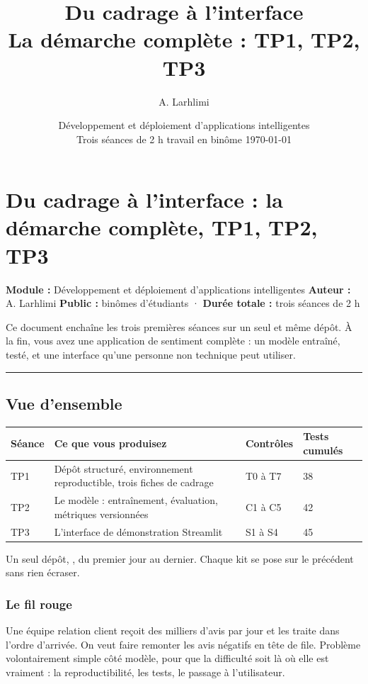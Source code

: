 \documentclass[11pt,a4paper]{article}
\title{\vspace{-1.2cm}\textbf{Du cadrage à l'interface\\ La démarche complète : TP1, TP2, TP3}}
\author{A. Larhlimi}
\date{Développement et déploiement d'applications intelligentes\\
Trois séances de 2 h \textperiodcentered{} travail en binôme \textperiodcentered{} \today}
\newcommand{\co}[1]{\texttt{\detokenize{#1}}}
\begin{document}
\maketitle
\thispagestyle{fancy}
\tableofcontents
\bigskip

\section{Du cadrage à l'interface : la démarche complète, TP1, TP2, TP3}

\textbf{Module :} Développement et déploiement d'applications intelligentes
\textbf{Auteur :} A. Larhlimi
\textbf{Public :} binômes d'étudiants · \textbf{Durée totale :} trois séances de 2 h

Ce document enchaîne les trois premières séances sur un seul et même dépôt. À la fin, vous avez une application de sentiment complète : un modèle entraîné, testé, et une interface qu'une personne non technique peut utiliser.

\par\noindent\rule{\textwidth}{0.4pt}

\subsection{Vue d'ensemble}

\begin{longtable}{@{}p{3.4cm}p{4.2cm}p{4.2cm}p{4.6cm}@{}}
\toprule
\textbf{Séance} & \textbf{Ce que vous produisez} & \textbf{Contrôles} & \textbf{Tests cumulés} \\
\midrule\endhead
TP1 & Dépôt structuré, environnement reproductible, trois fiches de cadrage & T0 à T7 & 38 \\
TP2 & Le modèle : entraînement, évaluation, métriques versionnées & C1 à C5 & 42 \\
TP3 & L'interface de démonstration Streamlit & S1 à S4 & 45 \\
\bottomrule
\end{longtable}


Un seul dépôt, \co{sentiment-app}, du premier jour au dernier. Chaque kit se pose sur le précédent sans rien écraser.

\subsubsection{Le fil rouge}

Une équipe relation client reçoit des milliers d'avis par jour et les traite dans l'ordre d'arrivée. On veut faire remonter les avis négatifs en tête de file. Problème volontairement simple côté modèle, pour que la difficulté soit là où elle est vraiment : la reproductibilité, les tests, le passage à l'utilisateur.
\end{document}
